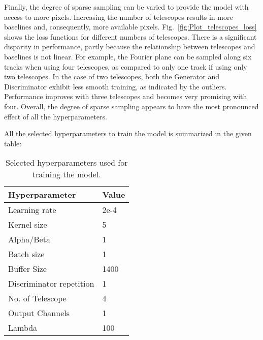 Finally, the degree of sparse sampling can be varied to provide the model with access to more pixels. Increasing the number of telescopes results in more baselines and, consequently, more available pixels. Fig.~\ref{fig:Plot_telescopes_loss} shows the loss functions for different numbers of telescopes. There is a significant disparity in performance, partly because the relationship between telescopes and baselines is not linear. For example, the Fourier plane can be sampled along six tracks when using four telescopes, as compared to only one track if using only two telescopes. In the case of two telescopes, both the Generator and Discriminator exhibit less smooth training, as indicated by the outliers. Performance improves with three telescopes and becomes very promising with four. Overall, the degree of sparse sampling appears to have the most pronounced effect of all the hyperparameters.

All the selected hyperparameters to train the model is summarized in the given table:
\begin{table}[ht]
	\centering
	\caption{Selected hyperparameters used for training the model.}
	\label{tab:hyperparameters}
	\begin{tabular}{ll}
		\hline
		\textbf{Hyperparameter} & \textbf{Value} \\
		\hline
		Learning rate           & 2e-4 \\
		Kernel size             & 5 \\
		Alpha/Beta              & 1 \\
		Batch size              & 1 \\
		Buffer Size             & 1400 \\
		Discriminator repetition  & 1 \\
		No. of Telescope        & 4 \\
		Output Channels         & 1 \\
		Lambda                  & 100 \\
		\hline
	\end{tabular}
\end{table}

